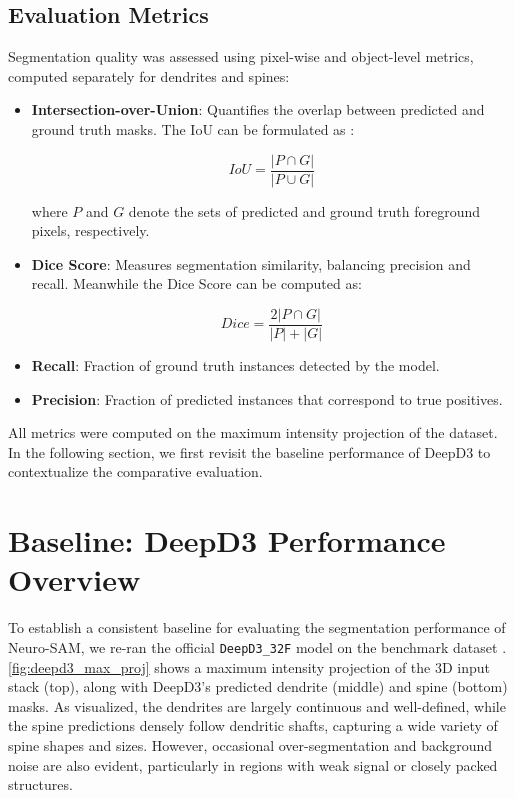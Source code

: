 \subsection{Evaluation Metrics}
Segmentation quality was assessed using pixel-wise and object-level metrics, computed separately for dendrites and spines:
\begin{itemize}
\item \textbf{Intersection-over-Union}: Quantifies the overlap between predicted and ground truth masks. The \gls{IoU} can be formulated as :

\[
IoU = \frac{|P \cap G|}{|P \cup G|}
\]

where $P$ and $G$ denote the sets of predicted and ground truth foreground pixels, respectively.
\item \textbf{Dice Score}: Measures segmentation similarity, balancing precision and recall. Meanwhile the Dice Score can be computed as:

\[
Dice = \frac{2 |P \cap G|}{|P| + |G|}
\]

\item \textbf{Recall}: Fraction of ground truth instances detected by the model.
\item \textbf{Precision}: Fraction of predicted instances that correspond to true positives.
\end{itemize}

All metrics were computed on the maximum intensity projection of the dataset. In the following section, we first revisit the baseline performance of \gls{DeepD3} to contextualize the comparative evaluation.

\section{Baseline: DeepD3 Performance Overview}
To establish a consistent baseline for evaluating the segmentation performance of Neuro-\gls{SAM}, we re-ran the official \texttt{\gls{DeepD3}\_32F} model on the benchmark dataset \cite{Fernholz_2024}. \autoref{fig:deepd3_max_proj} shows a maximum intensity projection of the 3D input stack (top), along with \gls{DeepD3}'s predicted dendrite (middle) and spine (bottom) masks. As visualized, the dendrites are largely continuous and well-defined, while the spine predictions densely follow dendritic shafts, capturing a wide variety of spine shapes and sizes. However, occasional over-segmentation and background noise are also evident, particularly in regions with weak signal or closely packed structures.



